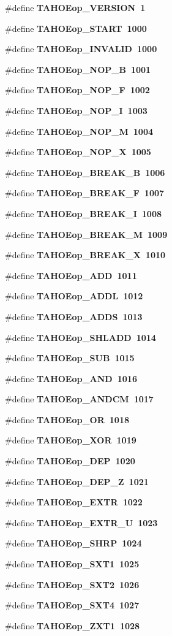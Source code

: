 \begin{CompactItemize}
\#define \bf{TAHOEop\_\-VERSION}~1
\item 
\#define \bf{TAHOEop\_\-START}~1000
\item 
\#define \bf{TAHOEop\_\-INVALID}~1000
\item 
\#define \bf{TAHOEop\_\-NOP\_\-B}~1001
\item 
\#define \bf{TAHOEop\_\-NOP\_\-F}~1002
\item 
\#define \bf{TAHOEop\_\-NOP\_\-I}~1003
\item 
\#define \bf{TAHOEop\_\-NOP\_\-M}~1004
\item 
\#define \bf{TAHOEop\_\-NOP\_\-X}~1005
\item 
\#define \bf{TAHOEop\_\-BREAK\_\-B}~1006
\item 
\#define \bf{TAHOEop\_\-BREAK\_\-F}~1007
\item 
\#define \bf{TAHOEop\_\-BREAK\_\-I}~1008
\item 
\#define \bf{TAHOEop\_\-BREAK\_\-M}~1009
\item 
\#define \bf{TAHOEop\_\-BREAK\_\-X}~1010
\item 
\#define \bf{TAHOEop\_\-ADD}~1011
\item 
\#define \bf{TAHOEop\_\-ADDL}~1012
\item 
\#define \bf{TAHOEop\_\-ADDS}~1013
\item 
\#define \bf{TAHOEop\_\-SHLADD}~1014
\item 
\#define \bf{TAHOEop\_\-SUB}~1015
\item 
\#define \bf{TAHOEop\_\-AND}~1016
\item 
\#define \bf{TAHOEop\_\-ANDCM}~1017
\item 
\#define \bf{TAHOEop\_\-OR}~1018
\item 
\#define \bf{TAHOEop\_\-XOR}~1019
\item 
\#define \bf{TAHOEop\_\-DEP}~1020
\item 
\#define \bf{TAHOEop\_\-DEP\_\-Z}~1021
\item 
\#define \bf{TAHOEop\_\-EXTR}~1022
\item 
\#define \bf{TAHOEop\_\-EXTR\_\-U}~1023
\item 
\#define \bf{TAHOEop\_\-SHRP}~1024
\item 
\#define \bf{TAHOEop\_\-SXT1}~1025
\item 
\#define \bf{TAHOEop\_\-SXT2}~1026
\item 
\#define \bf{TAHOEop\_\-SXT4}~1027
\item 
\#define \bf{TAHOEop\_\-ZXT1}~1028
\item 

\end{CompactItemize}
